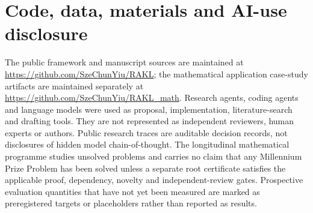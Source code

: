 \documentclass[11pt]{article}
\newcommand{\RAKL}{\textsc{RAKL}}
\begin{document}
\begin{abstract}
We further specify a governed upgrade protocol for \RAKL{} 3.x in which challengers are content-identified, fresh transfer is protected from proposer access, evaluators and thresholds are protected within an evaluation epoch, previous variants remain rollback targets and post-promotion attestation is separated from pre-promotion authorization. The present paper contributes the deployed experience substrate, longitudinal methodology, measurement-only metrology, current negative precursor evidence, causal-attribution instrumentation and upgrade-governance programme. At the publication evidence cutoff, the four-arm confirmatory packet is honestly refused as  after the shared \#247 capability floor, and execution is terminal ; the executor and harness remain instrument-only evidence. The independent retained-novelty audit awaits human annotators (\#255), and independent external assurance plus any claim that \RAKL{} 3.1 or later outperforms 3.0 remain unperformed stronger coordinates.
\end{abstract}











\label{sec:evaluation}






\section*{Code, data, materials and AI-use disclosure}
The public framework and manuscript sources are maintained at \url{https://github.com/SzeChunYiu/RAKL}; the mathematical application case-study artifacts are maintained separately at \url{https://github.com/SzeChunYiu/RAKL_math}. Research agents, coding agents and language models were used as proposal, implementation, literature-search and drafting tools. They are not represented as independent reviewers, human experts or authors. Public research traces are auditable decision records, not disclosures of hidden model chain-of-thought. The longitudinal mathematical programme studies unsolved problems and carries no claim that any Millennium Prize Problem has been solved unless a separate root certificate satisfies the applicable proof, dependency, novelty and independent-review gates. Prospective evaluation quantities that have not yet been measured are marked as preregistered targets or placeholders rather than reported as results.


\end{document}
